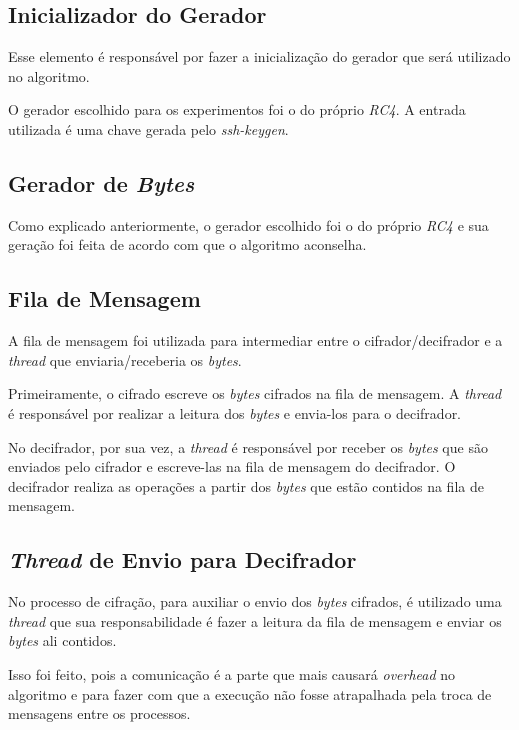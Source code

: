 \subsection{Inicializador do Gerador}

Esse elemento é responsável por fazer a inicialização do gerador que será utilizado  no algoritmo.

O gerador escolhido para os experimentos foi o do próprio \textit{RC4}. A entrada utilizada é uma chave gerada pelo \textit{ssh-keygen}.

\subsection{Gerador de \textit{Bytes}}

Como explicado anteriormente, o gerador escolhido foi o do próprio \textit{RC4} e sua geração foi feita de acordo com que o algoritmo aconselha. 


\subsection{Fila de Mensagem}

A fila de mensagem foi utilizada para intermediar entre o cifrador/decifrador e a \textit{thread} que enviaria/receberia os \textit{bytes}. 

Primeiramente, o cifrado escreve os \textit{bytes} cifrados na fila de mensagem. A \textit{thread} é responsável por realizar a leitura dos \textit{bytes} e envia-los para o decifrador.

No decifrador, por sua vez, a \textit{thread} é responsável por receber os \textit{bytes} que são enviados pelo cifrador e escreve-las na fila de mensagem do decifrador. O decifrador realiza as operações a partir dos \textit{bytes} que estão contidos na fila de mensagem.
  
\subsection{\textit{Thread} de Envio para Decifrador}

No processo de cifração, para auxiliar o envio dos \textit{bytes} cifrados, é utilizado uma \textit{thread} que sua responsabilidade é fazer a leitura da fila de mensagem e enviar os \textit{bytes} ali contidos. 

Isso foi feito, pois a comunicação é a parte que mais causará \textit{overhead} no algoritmo e para fazer com que a execução não fosse atrapalhada pela troca de mensagens entre os processos.
